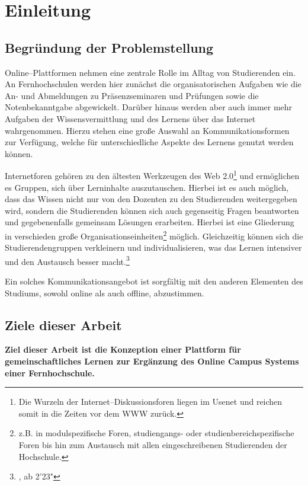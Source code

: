 \section{Einleitung} %
\label{sec:einleitung}

\subsection{Begründung der Problemstellung} %
\label{sub:begrundung_der_problemstellung}

Online--Plattformen nehmen eine zentrale Rolle im Alltag von Studierenden ein. An Fernhochschulen werden hier zunächst die organisatorischen Aufgaben wie die An- und Abmeldungen zu Präsenzseminaren und Prüfungen sowie die Notenbekanntgabe abgewickelt. Darüber hinaus werden aber auch immer mehr Aufgaben der Wissensvermittlung und des Lernens über das Internet wahrgenommen. Hierzu stehen eine große Auswahl an Kommunikationsformen zur Verfügung, welche für unterschiedliche Aspekte des Lernens genutzt werden können.

Internetforen gehören zu den ältesten Werkzeugen des Web 2.0\footnote{Die Wurzeln der Internet–Diskussionsforen liegen im Usenet und reichen somit in die Zeiten vor dem \ac{WWW} zurück.} und ermöglichen es Gruppen, sich über Lerninhalte auszutauschen. Hierbei ist es auch möglich, dass das Wissen nicht nur von den Dozenten zu den Studierenden weitergegeben wird, sondern die Studierenden können sich auch gegenseitig Fragen beantworten und gegebenenfalls gemeinsam Lösungen erarbeiten. Hierbei ist eine Gliederung in verschieden große Organisationseinheiten\footnote{z.B. in modulspezifische Foren, studiengangs- oder studienbereichspezifische Foren bis hin zum Austausch mit allen eingeschreibenen Studierenden der Hochschule.} möglich. Gleichzeitig können sich die  Studierendengruppen verkleinern und individualisieren, was das Lernen intensiver und den Austausch besser macht.\footnote{\cite{roegner:trends}, ab 2'23"}

Ein solches Kommunikationsangebot ist sorgfältig mit den anderen Elementen des Studiums, sowohl online als auch offline, abzustimmen.

\subsection{Ziele dieser Arbeit} %
\label{sub:ziele_dieser_arbeit}
\textbf{Ziel dieser Arbeit ist die Konzeption einer Plattform für gemeinschaftliches Lernen zur Ergänzung des Online Campus Systems einer Fernhochschule.}

